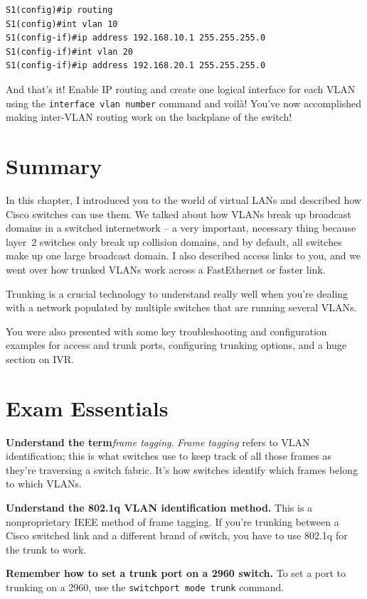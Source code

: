 \documentclass[b5paper,11pt]{memoir}
\begin{document}
\begin{verbatim}
S1(config)#ip routing
S1(config)#int vlan 10
S1(config-if)#ip address 192.168.10.1 255.255.255.0
S1(config-if)#int vlan 20
S1(config-if)#ip address 192.168.20.1 255.255.255.0
\end{verbatim}

And that's it! Enable IP routing and create one logical interface for
each VLAN using the \texttt{interface\ vlan\ number} command and voilà!
You've now accomplished making inter-VLAN routing work on the backplane
of the switch!

\section{Summary}

In this chapter, I introduced you to the world of virtual LANs and
described how Cisco switches can use them. We talked about how VLANs
break up broadcast domains in a switched internetwork -- a very
important, necessary thing because layer~2 switches only break up
collision domains, and by default, all switches make up one large
broadcast domain. I also described access links to you, and we went over
how trunked VLANs work across a FastEthernet or faster link.

Trunking is a crucial technology to understand really well when you're
dealing with a network populated by multiple switches that are running
several VLANs.

You were also presented with some key troubleshooting and configuration
examples for access and trunk ports, configuring trunking options, and a
huge section on IVR.

\section{Exam Essentials}

\textbf{Understand the term}\emph{frame tagging}. \emph{Frame tagging}
refers to VLAN identification; this is what switches use to keep track
of all those frames as they're traversing a switch fabric. It's how
switches identify which frames belong to which VLANs.

\textbf{Understand the 802.1q VLAN identification method.} This is a
nonproprietary IEEE method of frame tagging. If you're trunking between
a Cisco switched link and a different brand of switch, you have to use
802.1q for the trunk to work.

\textbf{Remember how to set a trunk port on a 2960 switch.} To set a
port to trunking on a 2960, use the \texttt{switchport\ mode\ trunk}
command.
\end{document}
